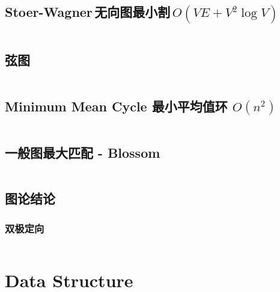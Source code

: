 \documentclass[titlepage, a4paper]{article}
\begin{document}
\begin{multicols}{2}
\begin{spacing}{0.6}
				\subsection{Stoer-Wagner\,无向图最小割\,$O(VE + V ^ 2 \log V)$}
					\inputminted{cpp}{src/yzh/Stoer-Wagner.cpp}
				\subsection{弦图}
					
					\inputminted{cpp}{src/TreeandGraph/弦图.cpp}
				\subsection{Minimum Mean Cycle 最小平均值环 $O(n^2)$}
					\inputminted{cpp}{src/TreeandGraph/MeanCycle.cpp}
				\subsection{一般图最大匹配 - Blossom}
					\inputminted{cpp}{src/TreeandGraph/Blossom.cpp}
				\subsection{图论结论}
					
					
					
					
					
					
					\subsubsection{双极定向}
					\inputminted{cpp}{src/tbr/bipolar_orientation.cpp}
					

			\section{Data Structure}

\end{spacing}
\end{multicols}
\end{document}
